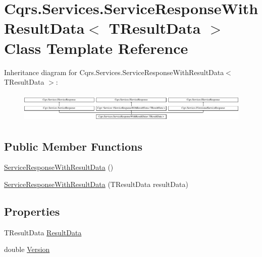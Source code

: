 \hypertarget{classCqrs_1_1Services_1_1ServiceResponseWithResultData}{}\section{Cqrs.\+Services.\+Service\+Response\+With\+Result\+Data$<$ T\+Result\+Data $>$ Class Template Reference}
\label{classCqrs_1_1Services_1_1ServiceResponseWithResultData}
Inheritance diagram for Cqrs.\+Services.\+Service\+Response\+With\+Result\+Data$<$ T\+Result\+Data $>$\+:\begin{figure}[H]
\begin{center}
\leavevmode
\includegraphics[height=1.454545cm]{classCqrs_1_1Services_1_1ServiceResponseWithResultData}
\end{center}
\end{figure}
\subsection*{Public Member Functions}
\begin{DoxyCompactItemize}
\item 
\hyperlink{classCqrs_1_1Services_1_1ServiceResponseWithResultData_a4241511df21804b73baec2b0c2e66402}{Service\+Response\+With\+Result\+Data} ()
\item 
\hyperlink{classCqrs_1_1Services_1_1ServiceResponseWithResultData_a63a840d449e8b06652130ffb1228432d}{Service\+Response\+With\+Result\+Data} (T\+Result\+Data result\+Data)
\end{DoxyCompactItemize}
\subsection*{Properties}
\begin{DoxyCompactItemize}
\item 
T\+Result\+Data \hyperlink{classCqrs_1_1Services_1_1ServiceResponseWithResultData_ab0768d40341eb667f362e5ddc8412810}{Result\+Data}
\item 
double \hyperlink{classCqrs_1_1Services_1_1ServiceResponseWithResultData_aefdac5ce3816eac021c47f62272969cd}{Version}
\end{DoxyCompactItemize}


